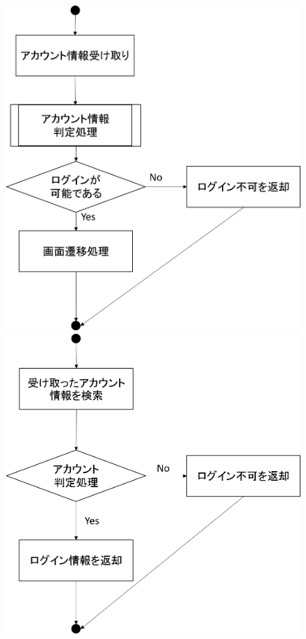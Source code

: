 \begin{figure}[htbp]
 \begin{minipage}{0.5\hsize}
  \begin{center}
   \includegraphics[width=1\linewidth,clip]{./img/admin_login/sub1.png}
  \end{center}
 \end{minipage}
 \begin{minipage}{0.5\hsize}
  \begin{center}
   \includegraphics[width=1\linewidth,clip]{./img/admin_login/sub2.png}

\end{center}
\end{minipage}
\end{figure}
